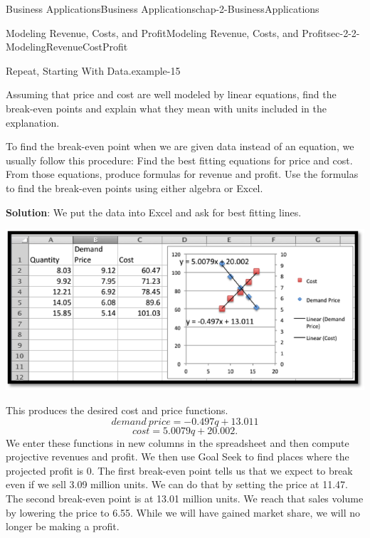 \documentclass[oneside,10pt,]{book}
\newcommand{\terminology}[1]{\textbf{#1}}
\numberwithin{equation}{section}
\begin{document}
\begin{chapterptx}{Business Applications}{}{Business Applications}{}{}{chap-2-BusinessApplications}
\begin{sectionptx}{Modeling Revenue, Costs, and Profit}{}{Modeling Revenue, Costs, and Profit}{}{}{sec-2-2-ModelingRevenueCostProfit}
\begin{example}{Repeat, Starting With Data.}{example-15}
\begin{sidebyside}{1}{0}{0}{0}
\end{sidebyside}%
\par
\hypertarget{p-674}{}%
Assuming that price and cost are well modeled by linear equations, find the break-even points and explain what they mean with units included in the explanation.%
\par
\hypertarget{p-675}{}%
To find the break-even point when we are given data instead of an equation, we usually follow this procedure: Find the best fitting equations for price and cost. From those equations, produce formulas for revenue and profit. Use the formulas to find the break-even points using either algebra or Excel.%
\par
\hypertarget{p-676}{}%
\terminology{Solution}: We put the data into Excel and ask for best fitting lines.%
\begin{sidebyside}{1}{0.1}{0.1}{0}%
\begin{sbspanel}{0.8}%
\includegraphics[width=1\linewidth]{images/sec2-2-9.png}
\end{sbspanel}%
\end{sidebyside}%
\par
\hypertarget{p-677}{}%
This produces the desired cost and price functions.%
%
\begin{equation*}
demand\ price=-0.497 q+13.011
\end{equation*}
%
\begin{equation*}
cost=5.0079 q+20.002.
\end{equation*}
\hypertarget{p-678}{}%
We enter these functions in new columns in the spreadsheet and then compute projective revenues and profit.  We then use Goal Seek to find places where the projected profit is 0.  The first break-even point tells us that we expect to break even if we sell 3.09 million units.  We can do that by setting the price at \textdollar{}11.47.  The second break-even point is at 13.01 million units.  We reach that sales volume by lowering the price to \textdollar{}6.55.  While we will have gained market share, we will no longer be making a profit.%

\end{example}
\end{sectionptx}
\end{chapterptx}
\end{document}
